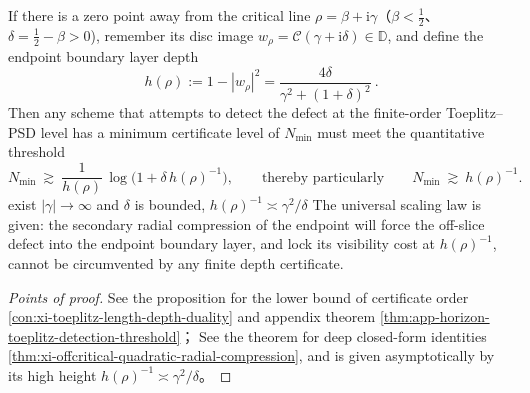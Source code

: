 \begin{conclusion}\label{con:xi-endpoint-visibility-lower-bound-toeplitz-order}
If there is a zero point away from the critical line \(\rho=\beta+\mathrm{i}\gamma\)（\(\beta<\tfrac12\)、\(\delta=\tfrac12-\beta>0\)), remember its disc image \(w_\rho=\mathcal{C}(\gamma+\mathrm{i}\delta)\in\mathbb{D}\), and define the endpoint boundary layer depth
\[
\boxed{\ h(\rho):=1-|w_\rho|^2=\frac{4\delta}{\gamma^2+(1+\delta)^2}\ }.
\]
Then any scheme that attempts to detect the defect at the finite-order Toeplitz--PSD level has a minimum certificate level of \(N_{\min}\) must meet the quantitative threshold
\[
N_{\min}\ \gtrsim\ \frac{1}{h(\rho)}\,\log\!\bigl(1+\delta\,h(\rho)^{-1}\bigr),
\qquad\text{thereby particularly}\qquad
N_{\min}\ \gtrsim\ h(\rho)^{-1}.
\]
exist \(|\gamma|\to\infty\) and \(\delta\) is bounded,
\(
h(\rho)^{-1}\asymp \gamma^2/\delta
\)
The universal scaling law is given: the secondary radial compression of the endpoint will force the off-slice defect into the endpoint boundary layer, and lock its visibility cost at \(h(\rho)^{-1}\), cannot be circumvented by any finite depth certificate.
\end{conclusion}
\begin{proof}[Points of proof]
See the proposition for the lower bound of certificate order \ref{con:xi-toeplitz-length-depth-duality} and appendix theorem \ref{thm:app-horizon-toeplitz-detection-threshold}；
See the theorem for deep closed-form identities \ref{thm:xi-offcritical-quadratic-radial-compression}, and is given asymptotically by its high height \(h(\rho)^{-1}\asymp \gamma^2/\delta\)。
\end{proof}

